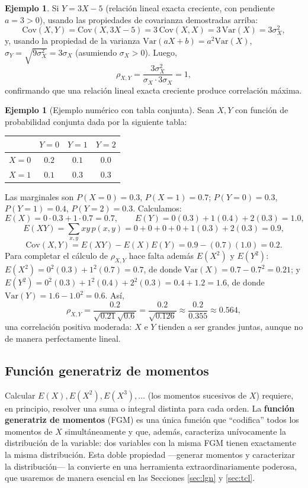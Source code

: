 \documentclass[11pt,a4paper]{article}
\theoremstyle{plain}
\theoremstyle{definition}
\newtheorem{ejemplo}[teorema]{Ejemplo}
\theoremstyle{remark}
\begin{document}
\begin{ejemplo}
Si $Y=3X-5$ (relación lineal exacta creciente, con pendiente $a=3>0$), usando las propiedades de covarianza demostradas arriba:
\[
\text{Cov}(X,Y) = \text{Cov}(X,3X-5) = 3\,\text{Cov}(X,X) = 3\,\text{Var}(X) = 3\sigma_X^2,
\]
y, usando la propiedad de la varianza $\text{Var}(aX+b)=a^2\text{Var}(X)$, $\sigma_Y = \sqrt{9\sigma_X^2}=3\sigma_X$ (asumiendo $\sigma_X>0$). Luego,
\[
\rho_{X,Y} = \frac{3\sigma_X^2}{\sigma_X\cdot 3\sigma_X} = 1,
\]
confirmando que una relación lineal exacta creciente produce correlación máxima.
\end{ejemplo}

\begin{ejemplo}[Ejemplo numérico con tabla conjunta]
Sean $X,Y$ con función de probabilidad conjunta dada por la siguiente tabla:
\begin{center}
\begin{tabular}{c|ccc}
 & $Y=0$ & $Y=1$ & $Y=2$ \\ \hline
$X=0$ & $0.2$ & $0.1$ & $0.0$ \\
$X=1$ & $0.1$ & $0.3$ & $0.3$
\end{tabular}
\end{center}
Las marginales son $P(X=0)=0.3$, $P(X=1)=0.7$; $P(Y=0)=0.3$, $P(Y=1)=0.4$, $P(Y=2)=0.3$. Calculamos:
\[
E(X) = 0\cdot 0.3+1\cdot 0.7 = 0.7, \qquad E(Y) = 0(0.3)+1(0.4)+2(0.3) = 1.0,
\]
\[
E(XY) = \sum_{x,y} xy\,p(x,y) = 0+0+0+0+1(0.3)+2(0.3) = 0.9,
\]
\[
\text{Cov}(X,Y) = E(XY)-E(X)E(Y) = 0.9 - (0.7)(1.0) = 0.2.
\]
Para completar el cálculo de $\rho_{X,Y}$ hace falta además $E(X^2)$ y $E(Y^2)$: $E(X^2)=0^2(0.3)+1^2(0.7)=0.7$, de donde $\text{Var}(X)=0.7-0.7^2=0.21$; y $E(Y^2)=0^2(0.3)+1^2(0.4)+2^2(0.3)=0.4+1.2=1.6$, de donde $\text{Var}(Y)=1.6-1.0^2=0.6$. Así,
\[
\rho_{X,Y} = \frac{0.2}{\sqrt{0.21}\sqrt{0.6}} = \frac{0.2}{\sqrt{0.126}} \approx \frac{0.2}{0.355} \approx 0.564,
\]
una correlación positiva moderada: $X$ e $Y$ tienden a ser grandes juntas, aunque no de manera perfectamente lineal.
\end{ejemplo}

\subsection{Función generatriz de momentos}

Calcular $E(X), E(X^2), E(X^3),\dots$ (los momentos sucesivos de $X$) requiere, en principio, resolver una suma o integral distinta para cada orden. La \textbf{función generatriz de momentos} (FGM) es una única función que ``codifica'' todos los momentos de $X$ simultáneamente y que, además, caracteriza unívocamente la distribución de la variable: dos variables con la misma FGM tienen exactamente la misma distribución. Esta doble propiedad —generar momentos y caracterizar la distribución— la convierte en una herramienta extraordinariamente poderosa, que usaremos de manera esencial en las Secciones \ref{sec:lgn} y \ref{sec:tcl}.
\end{document}
